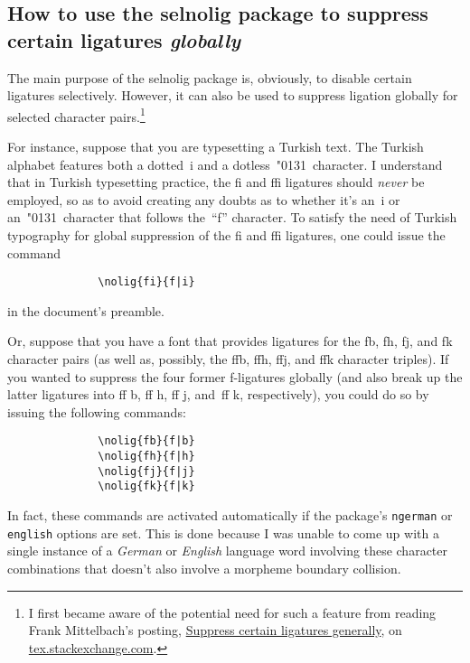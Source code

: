 \documentclass[11pt]{article}
\newcommand{\pkg}[1]{\textsf{#1}}
\newcommand{\opt}[1]{\texttt{#1}}
\begin{document}
\subsection[How to use the selnolig package to suppress certain ligatures globally]{How to use the \pkg{selnolig} package to suppress certain ligatures \emph{globally}}
\label{sec:global-nolig}


The main purpose of the \pkg{selnolig} package is, obviously, to disable certain ligatures selectively. However, it can also be used to suppress ligation globally for selected character pairs.\footnote{I first became aware of the potential need for such a feature from reading Frank Mittelbach's posting, \href{http://tex.stackexchange.com/q/61042/5001}{Suppress certain ligatures generally}, on \url{tex.stackexchange.com}. } 

For instance, suppose that you are typesetting a Turkish text. The Turkish alphabet features both a dotted~i and a dotless~\char"0131\ character. I understand that in Turkish typesetting practice, the fi and ffi ligatures should \emph{never} be employed, so as to avoid creating any doubts as to whether it's an~i or an~\char"0131\ character that follows the~\enquote{f} character. To satisfy the need of Turkish typography for global suppression of the fi and ffi ligatures, one could issue the command
\begin{Verbatim}
              \nolig{fi}{f|i}
\end{Verbatim}
in the document's preamble.


Or, suppose that you have a font that provides ligatures for the {\ebg \mbox{fb}, \mbox{fh}, \mbox{fj},} and {\ebg\mbox{fk}} character pairs (as well as, possibly, the {\ebg \mbox{ffb}, \mbox{ffh}, \mbox{ffj},} and {\ebg\mbox{ffk}} character triples). If you wanted to suppress the four former f-ligatures globally (and also break up the latter ligatures into ff\kern0pt b, ff\kern0pt h, ff\kern0pt j, and~ff\kern0pt k, respectively), you could do so by issuing the following commands: 
\begin{Verbatim}
              \nolig{fb}{f|b}
              \nolig{fh}{f|h}
              \nolig{fj}{f|j}
              \nolig{fk}{f|k}
\end{Verbatim}
In fact, these commands are activated automatically if the package's \opt{ngerman} or \opt{english} options are set. This is done because I was unable to come up with a single instance of a \emph{German} or \emph{English} language word involving these character combinations that doesn't also involve a morpheme boundary collision.
\end{document}
